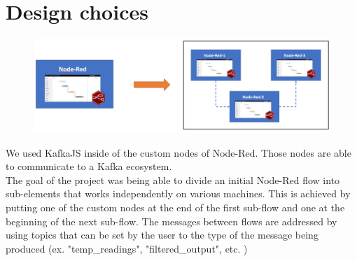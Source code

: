 \documentclass[a4paper, 12pt]{extarticle}
\begin{document}
\newpage

\section{Design choices}
\begin{figure}[h]
    \centering
    \includegraphics[width=\textwidth]{images/before_after.PNG}
    \label{fig:before-after}
\end{figure}
We used KafkaJS inside of the custom nodes of Node-Red. Those nodes are able to communicate to a Kafka ecosystem. \\
The goal of the project was being able to divide an initial Node-Red flow into sub-elements that works independently on various machines. This is achieved by putting one of the custom nodes at the end of the first sub-flow and one at the beginning of the next sub-flow. 
The messages between flows are addressed by using topics that can be set by the user to the type of the message being produced (ex. "temp\_readings", "filtered\_output", etc. )
\end{document}
